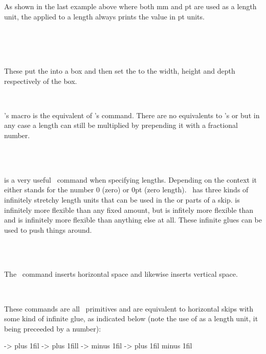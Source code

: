     As shown in the last example above where both mm and pt are used as a 
length unit, the \cmd{\the} applied to a length always prints the value
in pt units.

\begin{syntax}
\cmd{\settowidth} \\
\cmd{\settoheight} \\
\cmd{\settodepth} \\
\end{syntax}
These put the  into a box and then set the  to the
width, height and depth respectively of the box.

\begin{syntax}
\cmd{\addtolength} \\
\end{syntax}
\ltx's \cmd{\addtolength} macro is the equivalent of \tx's \cmd{\advance}
command. There are no equivalents to \tx's \cmd{\multiply} or \cmd{\divide}
but in any case a length can still be multiplied by prepending it with 
a fractional number.


\begin{syntax}
\cmd{\z@} \\
   \\
\end{syntax}
\cmd{\z@} is a very useful \ltx\ command when specifying lengths.
Depending on the context it either stands for the number 0 (zero)
or 0pt (zero length). \tx\ has three kinds of infinitely stretchy 
length units that can be used in the  or  
parts of a skip.
 is infinitely more flexible than any fixed amount, but
 is infitely more flexible than  and 
is infinitely more flexible than anything else at all. These infinite
glues can be used to push things around.

\begin{syntax}
\cmd{\hskip} \\
\cmd{\vskip} \\
\end{syntax}
The \tx\ command \cmd{\hskip} inserts  horizontal space
and likewise \cmd{\vskip} inserts  vertical space.

\begin{syntax}
\cmd{\hfil} \cmd{\hfill} \cmd{\hfilneg} \cmd{\hss} \\
\end{syntax}
These commands are all \tx\ primitives and are equivalent to horizontal 
skips with some kind of infinite glue, as indicated below (note the use
of  as a length unit, it being preceeded by a number):
\begin{lcode}
\hfil     -> \hskip 0pt plus 1fil
\hfill    -> \hskip 0pt plus 1fill
\hfilneg  -> \hskip 0pt           minus 1fil
\hss      -> \hskip 0pt plus 1fil minus 1fil
\end{lcode}

